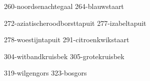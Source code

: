 \begin{figure*}[h!]
    \subfig
    {260-noordsenachtegaal}
    {264-blauwstaart}

    \subfig
    {272-aziatischeroodborsttapuit}
    {277-izabeltapuit}

    \subfig
    {278-woestijntapuit}
    {291-citroenkwikstaart}

    \subfig
    {304-witbandkruisbek}
    {305-grotekruisbek}
    

    \subfig
    {319-wilgengors}
    {323-bosgors}
\end{figure*}